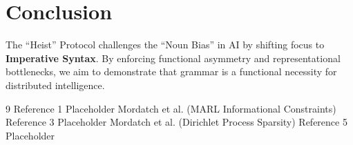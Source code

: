 \documentclass[11pt]{article}
\begin{document}
\section{Conclusion}
The ``Heist'' Protocol challenges the ``Noun Bias'' in AI by shifting focus to \textbf{Imperative Syntax}. By enforcing functional asymmetry and representational bottlenecks, we aim to demonstrate that grammar is a functional necessity for distributed intelligence.

\begin{thebibliography}{9}
 Reference 1 Placeholder
 Mordatch et al. (MARL Informational Constraints)
 Reference 3 Placeholder
 Mordatch et al. (Dirichlet Process Sparsity)
 Reference 5 Placeholder
\end{thebibliography}
\end{document}
